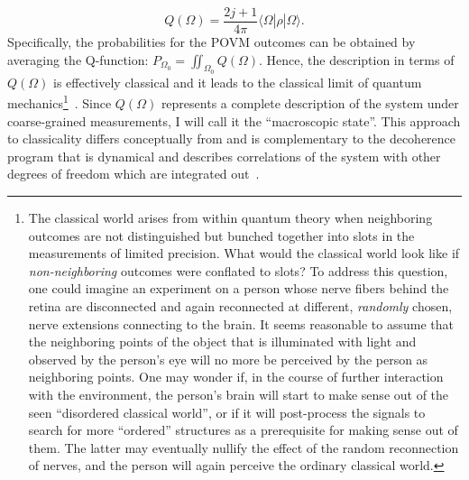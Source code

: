 \documentclass[12pt]{article}
\begin{document}
\begin{equation}
Q(\Omega) = \frac{2j+1}{4\pi} \langle\Omega|\hat{\rho}|\Omega\rangle.
\end{equation}
Specifically, the probabilities for the POVM outcomes can be obtained by averaging the Q-function: $P_{\Omega_0} = \iint_{\Omega_0} Q(\Omega)$. Hence, the description in terms of $Q(\Omega)$ is effectively classical and it leads to the classical limit of quantum mechanics\footnote{The classical world arises from within quantum theory when neighboring outcomes are not distinguished but bunched together into slots in the measurements of limited precision. What would the classical world look like if {\it non-neighboring} outcomes were conflated to slots? To address this question, one could imagine an experiment on a person whose nerve fibers behind the retina are disconnected and again reconnected at different, {\it randomly} chosen, nerve extensions connecting to the brain. It seems reasonable to assume that the neighboring points of the object that is illuminated with light and observed by the person's eye will no more be perceived by the person as neighboring points. One may wonder if, in the course of further interaction with the environment, the person's brain will start to make sense out of the seen ``disordered classical world'', or if it will post-process the signals to search for more ``ordered'' structures as a prerequisite for making sense out of them. The latter may eventually nullify the effect of the random reconnection of nerves, and the person will again perceive the ordinary classical world.}~\cite{kofler}. Since $Q(\Omega)$ represents a complete description of the system under coarse-grained measurements, I will call it the ``macroscopic state''. This approach to classicality differs conceptually from and is complementary to the decoherence program that is dynamical and describes correlations of the system with other degrees of freedom which are integrated out~\cite{zurek}.
\end{document}
